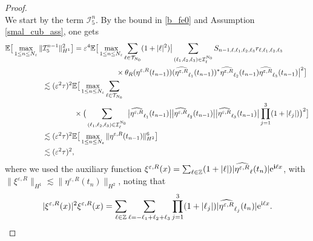 \documentclass[a4paper]{amsart}
\begin{document}
\begin{proof}
\begin{equation}
   \end{equation}
 We start by the term $\mathcal{I}_5^n$. By the bound in \eqref{b_fe0} and Assumption \ref{smal_cub_ass}, one gets
   \begin{align*}
       \mathbb{E}\big[\max_{1\le n\le N_\varepsilon}\|\mathcal{I}_5^{n-1}\|^{2}_{H^1}\big]& = \varepsilon^4\mathbb{E}\big[\max_{1\le n\le N_\varepsilon}\sum_{\ell\in\mathcal{T}_{N_0}} (1+|\ell|^2)\big|
      \sum_{(\ell_1,\ell_2,\ell_3)\in\mathcal{I}_{\ell}^{N_0}} S_{n-1,\ell,\ell_1,\ell_2,\ell_3}r_{\ell,\ell_1,\ell_2,\ell_3}\\
      &\hspace{2cm}\times \theta_R(\eta^{\varepsilon,R}(t_{n-1}))(\widehat{\eta^{\varepsilon,R}}_{\ell_1}(t_{n-1}))^*\widehat{\eta^{\varepsilon,R}}_{\ell_2}(t_{n-1}) \widehat{\eta^{\varepsilon,R}}_{\ell_3}(t_{n-1})
       \big|^2\big]\\
       &\hspace{-1.5cm}\lesssim (\varepsilon^2 \tau)^{2}\mathbb{E}\big[\max_{1\le n\le N_\varepsilon}\sum_{\ell\in\mathcal{T}_{N_0}}\\
       &\times \big(\sum_{(\ell_1,\ell_2,\ell_3)\in\mathcal{I}_{\ell}^{N_0}}
       \big|\widehat{\eta^{\varepsilon,R}}_{\ell_1}(t_{n-1})\big| \big|\widehat{\eta^{\varepsilon,R}}_{\ell_2}(t_{n-1})\big| \big|\widehat{\eta^{\varepsilon,R}}_{\ell_3}(t_{n-1})\big| \prod_{j=1}^{3}(1+|\ell_j|)\big)^2\big]\\
       &\hspace{-1.5cm}\lesssim (\varepsilon^2 \tau)^{2}\mathbb{E}\big[\max_{1\le n\le N_\varepsilon}\|\eta^{\varepsilon,R}(t_{n-1})\|^{6}_{H^2}\big]\\
       &\hspace{-1.5cm}\lesssim (\varepsilon^2 \tau)^{2},
   \end{align*}
   where we used the auxiliary function $\xi^{\varepsilon,R}(x)=\sum_{\ell \in \mathbb{Z}} (1+|\ell|) |\widehat{\eta^{\varepsilon,R}}_{\ell}(t_n)| {\rm e}^{{\bf i}\ell x}$, with $\|\xi^{\varepsilon,R}\|_{H^1}\lesssim \|\eta^{\varepsilon,R}(t_n)\|_{H^2}$, noting that
   $$
   |\xi^{\varepsilon,R}(x)|^2\xi^{\varepsilon,R}(x)=\sum_{\ell\in\mathbb{Z}}\sum_{\ell=-\ell_1+\ell_2+\ell_3}\prod_{j=1}^{3} (1+|\ell_j|)|\widehat{\eta^{\varepsilon,R}}_{\ell_j}(t_n)|{\rm e}^{{\rm i}\ell x}.
   $$

\end{proof}
\end{document}
